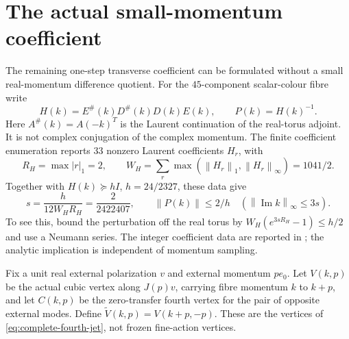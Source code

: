 \documentclass[11pt,oneside,openany]{book}
\theoremstyle{definition}
\theoremstyle{remark}
\newcommand{\norm}[1]{\left\lVert#1\right\rVert}
\newcommand{\src}[2]{\cite[#2]{#1}}
\begin{document}
\section{The actual small-momentum coefficient}
\label{sec:actual-theta}
The remaining one-step transverse coefficient can be formulated without
a small real-momentum difference quotient. For the $45$-component
scalar-colour fibre write
\[
 H(k)=E^\#(k)D^\#(k)D(k)E(k),\qquad P(k)=H(k)^{-1}.
\]
Here $A^\#(k)=A(-k)^T$ is the Laurent continuation of the real-torus
adjoint. It is not complex conjugation of the complex momentum.
The finite coefficient enumeration reports $33$ nonzero Laurent
coefficients $H_r$, with
\[
 R_H=\max|r|_1=2,\qquad
 W_H=\sum_r\max(\norm{H_r}_1,\norm{H_r}_\infty)=1041/2.
\]
Together with $H(k)\succeq hI$, $h=24/2327$, these data give
\begin{equation}\label{eq:actual-holomorphic-strip}
 s=\frac{h}{12W_HR_H}=\frac2{2422407},\qquad
 \norm{P(k)}\le2/h\quad(\norm{\operatorname{Im}k}_\infty\le3s).
\end{equation}
To see this, bound the perturbation off the real torus by
$W_H(e^{3sR_H}-1)\le h/2$ and use a Neumann series.
The integer coefficient data are reported in \src{F12}{V5}; the
analytic implication is independent of momentum sampling.

Fix a unit real external polarization $v$ and external momentum $pe_0$.
Let $V(k,p)$ be the actual cubic vertex along $J(p)v$, carrying fibre
momentum $k$ to $k+p$, and let $C(k,p)$ be the zero-transfer fourth
vertex for the pair of opposite external modes. Define
$\widetilde V(k,p)=V(k+p,-p)$. These are the vertices of
\cref{eq:complete-fourth-jet}, not frozen fine-action vertices.
\end{document}
